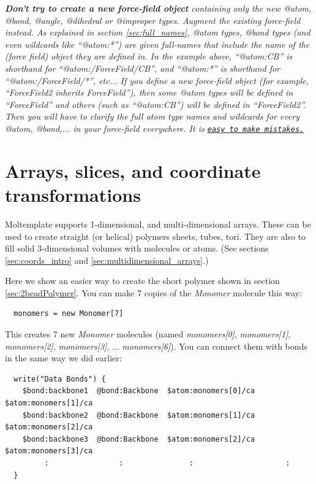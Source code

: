 \documentclass[11pt]{article}
\begin{document}
\textit{
\textbf{Don't try to create a new force-field object}
containing only the new @atom, @bond, @angle, @dihedral or @improper types.
Augment the existing force-field instead.
As explained in section \ref{sec:full_names},
@atom types, @bond types
(and even wildcards like ``@atom:*'')
are given full-names that include the name of the (force field)
object they are defined in.
In the example above, ``@atom:CB'' is shorthand for ``@atom:/ForceField/CB'', and ``@atom:*'' is shorthand for ``@atom:/ForceField/*'', etc...
If you define a new force-field object
(for example, ``ForceField2 inherits ForceField''),
then some @atom types will be defined in ``ForceField''
and others (such as ``@atom:CB'') will be defined in ``ForceField2''.
Then you will have to clarify the full atom type names and wildcards
for every @atom, @bond,... in your force-field everywhere.
It is \href{https://github.com/jewettaij/moltemplate/issues/103}{\tt easy to make mistakes.}
}



\section{Arrays, slices, and coordinate transformations}
\label{sec:arrays}
Moltemplate supports 1-dimensional, and multi-dimensional arrays.
These can be used to create straight (or helical) polymers
sheets, tubes, tori.
They are also to fill solid 3-dimensional volumes
with molecules or atoms.
(See sections \ref{sec:coords_intro} and \ref{sec:multidimensional_arrays}.)

Here we show an easier way to create the short polymer 
shown in section \ref{sec:2beadPolymer}.
You can make 7 copies of the \textit{Monomer} molecule this way:
\begin{verbatim}
  monomers = new Monomer[7]
\end{verbatim}
This creates 7 new \textit{Monomer} molecules (named 
\mbox{\textit{monomers[0]}}, 
\mbox{\textit{monomers[1]}}, 
\mbox{\textit{monomers[2]}}, 
\mbox{\textit{monomers[3]}}, ... 
\mbox{\textit{monomers[6]}}).
You can connect them with bonds in the same way we did earlier:
\begin{verbatim}
  write("Data Bonds") {
    $bond:backbone1  @bond:Backbone  $atom:monomers[0]/ca  $atom:monomers[1]/ca
    $bond:backbone2  @bond:Backbone  $atom:monomers[1]/ca  $atom:monomers[2]/ca
    $bond:backbone3  @bond:Backbone  $atom:monomers[2]/ca  $atom:monomers[3]/ca
         :                :               :                     :
  }
\end{verbatim}
\end{document}
